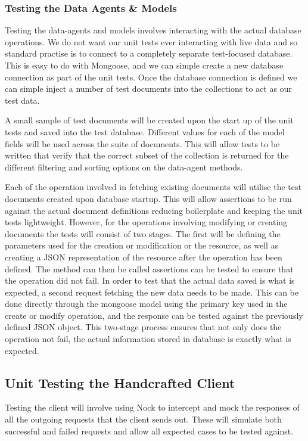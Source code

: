 \subsubsection{Testing the Data Agents \& Models}
Testing the data-agents and models involves interacting with the actual database operations. We do not want our unit tests ever interacting with live data and so standard practise is to connect to a completely separate test-focused database. This is easy to do with Mongoose, and we can simple create a new database connection as part of the unit tests. Once the database connection is defined we can simple inject a number of test documents into the collections to act as our test data.

A small sample of test documents will be created upon the start up of the unit tests and saved into the test database. Different values for each of the model fields will be used across the suite of documents. This will allow tests to be written that verify that the correct subset of the collection is returned for the different filtering and sorting options on the data-agent methods.

Each of the operation involved in fetching existing documents will utilise the test documents created upon database startup. This will allow assertions to be run against the actual document definitions reducing boilerplate and keeping the unit tests lightweight. However, for the operations involving modifying or creating documents the tests will consist of two stages. The first will be defining the parameters used for the creation or modification or the resource, as well as creating a JSON representation of the resource after the operation has been defined. The method can then be called assertions can be tested to ensure that the operation did not fail. In order to test that the actual data saved is what is expected, a second request fetching the new data needs to be made. This can be done directly through the mongoose model using the primary key used in the create or modify operation, and the response can be tested against the previously defined JSON object. This two-stage process ensures that not only does the operation not fail, the actual information stored in database is exactly what is expected.
\subsection{Unit Testing the Handcrafted Client}
Testing the client will involve using Nock to intercept and mock the responses of all the outgoing requests that the client sends out. These will simulate both successful and failed requests and allow all expected cases to be tested against.

